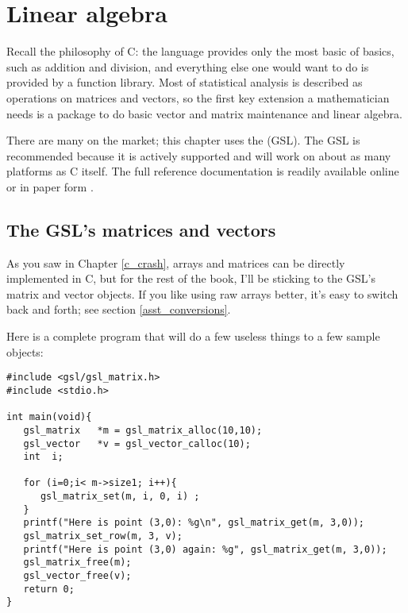 \chapter[Linear Algebra]{Linear algebra} \label{linear_algebra} 

Recall the philosophy of C: the language provides only the most basic of
basics, such as addition and division, and everything else one would
want to do is provided by a function library. Most of statistical analysis is
described as operations on matrices and vectors, so the first key
extension a mathematician needs is a package to do basic vector and
matrix maintenance and linear algebra.

There are many on the market; this chapter uses the  (GSL). The GSL is recommended because it is actively supported
and will work on about as many platforms as C itself. The full reference
documentation is readily available online or in paper form
\citep{gough:gsl}.

\section{The GSL's matrices and vectors}
As you saw in Chapter \ref{c_crash}, arrays and matrices can be directly implemented in C, but for
the rest of the book, I'll be sticking to the GSL's matrix and vector objects.
If you like using raw arrays better, it's easy to switch back and forth; see
section \ref{asst_conversions}.


Here is a complete program that will do a few useless things to a few sample
objects:\label{gslexample}
\begin{lstlisting}
#include <gsl/gsl_matrix.h>
#include <stdio.h>

int main(void){
   gsl_matrix   *m = gsl_matrix_alloc(10,10);
   gsl_vector   *v = gsl_vector_calloc(10);
   int  i;

   for (i=0;i< m->size1; i++){
      gsl_matrix_set(m, i, 0, i) ;
   }
   printf("Here is point (3,0): %g\n", gsl_matrix_get(m, 3,0));
   gsl_matrix_set_row(m, 3, v);
   printf("Here is point (3,0) again: %g", gsl_matrix_get(m, 3,0));
   gsl_matrix_free(m);
   gsl_vector_free(v);
   return 0;
}
\end{lstlisting}
